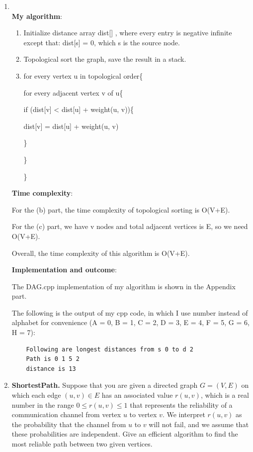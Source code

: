 \documentclass[12pt,a4paper]{article}
\makeatletter
\newtheorem*{solution}{Solution}
\theoremstyle{definition}
\renewenvironment{solution}[1][Solution] {\par\pushQED{\qed}\normalfont\topsep6\p@\@plus6\p@\relax\trivlist\item[\hskip\labelsep\bfseries#1\@addpunct{.}]\ignorespaces}{\popQED\endtrivlist\@endpefalse} \makeatother
\makeatother
\begin{document}
\begin{enumerate}
\begin{solution}
	~\\
   \textbf{My algorithm}:
   \begin{enumerate}
   	\item Initialize distance array dist[] , where every entry is negative infinite except that: dist[s] = 0, which s is the source node.
   	\item Topological sort the graph,  save the result in a stack.
   	\item
   	for every vertex u in topological order\{
   		
   	\qquad for every adjacent  vertex v of u\{
   
   \qquad \qquad if (dist[v] < dist[u] + weight(u, v))\{
   
    \qquad \qquad \qquad dist[v] = dist[u] + weight(u, v)
    
    \qquad \qquad \}
   
   \qquad \}
   
   \}
   
   \end{enumerate}
	
	\textbf{Time complexity}:
	
	For the (b) part, the time complexity of topological sorting is O(V+E). 
	
	For the (c) part, we have v nodes and total adjacent vertices is E, so we need  O(V+E). 
	
	Overall, the time complexity of this algorithm is O(V+E).
	
	\textbf{Implementation and outcome}:
	
	 The DAG.cpp implementation of my algorithm is shown in the Appendix part.

	The following is the output of my cpp code, in which I use number instead of alphabet for convenience (A = 0, B = 1, C = 2, D = 3, E = 4, F = 5, G = 6, H = 7):
	 \begin{lstlisting}
	Following are longest distances from s 0 to d 2 
	Path is 0 1 5 2
	distance is 13 
	\end{lstlisting}
	
\end{solution}



\item \textbf{ShortestPath.} Suppose that you are given a directed graph $G=(V,E)$ on which each edge $(u,v) \in E$ has an associated value $r(u,v)$, which is a real number in the range $0 \leq r(u,v) \leq 1$ that represents the reliability of a communication channel from vertex $u$ to vertex $v$. We interpret $r(u,v)$ as the probability that the channel from $u$ to $v$ will not fail, and we assume that these probabilities are independent. Give an efficient algorithm to find the most reliable path between two given vertices.


\end{enumerate}
\end{document}
